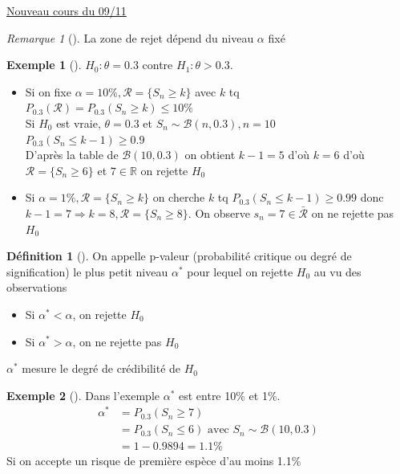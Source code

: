 \documentclass{article}
\theoremstyle{plain}%
\theoremstyle{definition}
\newtheorem{defn}{Définition}[section]
\newtheorem{exmp}{Exemple}[section]
\theoremstyle{remark}
\newtheorem*{rem}{Remarque}
\begin{document}
\underline{Nouveau cours du 09/11} \\

\begin{rem}[]
    La zone de rejet dépend du niveau $ \alpha  $ fixé
    \begin{exmp}[]
        $ H_0 : \theta =0.3 $ contre $ H_1: \theta > 0.3 $. \\
        \begin{itemize}
            \item Si on fixe $ \alpha = 10\%, \mathcal{R} = \{S_n \geq k\} $ avec $ k $ tq $ P_{0.3}(\mathcal{R}) = P_{0.3}(S_n \geq k) \leq 10\% $ \\
            Si $ H_0 $ est vraie, $ \theta =0.3 $ et $ S_n \sim \mathcal{B} (n,0.3), n=10 $ \\
            $ P_{0.3} (S_n \leq k-1) \geq 0.9 $ \\
            D'après la table de $ \mathcal{B}(10, 0.3) $ on obtient $ k-1=5 $ d'où $ k=6 $ d'où $ \mathcal{R}= \{S_n \geq 6\} $ et $ 7 \in \mathbb{R} $ on rejette $ H_0 $ 
            \item Si $ \alpha = 1\%, \mathcal{R}=\{S_n \geq k\}  $ on cherche $ k $ tq $ P_{0.3}(S_n \leq k-1) \geq 0.99 $ donc $ k-1=7 \Rightarrow k=8, \mathcal{R}=\{S_n \geq 8\} $. On observe $ s_n=7 \in \bar{\mathcal{R}} $ on ne rejette pas $ H_0 $ 
        \end{itemize}
    \end{exmp}    
\end{rem}

\begin{defn}[]
    On appelle p-valeur (probabilité critique ou degré de signification) le plus petit niveau $ \alpha ^* $ pour lequel on rejette $ H_0 $ au vu des observations
    \begin{itemize}
        \item Si $ \alpha ^* < \alpha  $, on rejette $ H_0 $ 
        \item Si $ \alpha ^* > \alpha  $, on ne rejette pas $ H_0 $  
    \end{itemize} 
    $ \alpha ^* $ mesure le degré de crédibilité de $ H_0 $ 
\end{defn}
\begin{exmp}[]
    Dans l'exemple $ \alpha ^* $ est entre 10\% et 1\%. 
    \begin{align*}
        \alpha ^* &= P_{0.3}(S_n \geq 7) \\
                &= P_{0.3}(S_n \leq 6) \text{ avec } S_n \sim \mathcal{B}(10,0.3)\\
                &= 1 - 0.9894 = 1.1\%
    \end{align*}
    Si on accepte un risque de première espèce d'au moins 1.1\%
\end{exmp}
\end{document}
